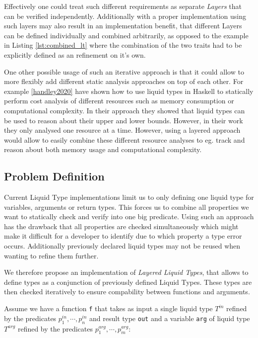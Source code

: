 \documentclass[acmsmall, review, screen]{acmart}
\begin{document}
Effectively one could treat such different requirements as separate \textit{Layers} that can be verified independently. Additionally with a proper implementation using such layers may also result in an implementation benefit, that different Layers can be defined individually and combined arbitrarily, as opposed to the example in Listing \ref{lst:combined_lt} where the combination of the two traits had to be explicitly defined as an refinement on it's own.

One other possible usage of such an iterative approach is that it could allow to more flexibly add different static analysis approaches on top of each other. For example \ref{handley2020} have shown how to use liquid types in Haskell to statically perform cost analysis of different resources such as memory consumption or computational complexity. In their approach they showed that liquid types can be used to reason about their upper and lower bounds. However, in their work they only analysed one resource at a time. However, using a layered approach would allow to easily combine these different resource analyses to eg. track and reason about both memory usage and computational complexity.

\subsection{Problem Definition}

Current Liquid Type implementations limit us to only defining one liquid type for variables, arguments or return types. This forces us to combine all properties we want to statically check and verify into one big predicate. Using such an approach has the drawback that all properties are checked simultaneously which might make it difficult for a developer to identify due to which property a type error occurs. Additionally previously declared liquid types may not be reused when wanting to refine them further.

We therefore propose an implementation of \textit{Layered Liquid Types}, that allows to define types as a conjunction of previously defined Liquid Types. These types are then checked iteratively to ensure compability between functions and arguments.

Assume we have a function \texttt{f} that takes as input a single liquid type $T^{in}$ refined by the predicates $p^{in}_1,\cdots,p^{in}_n$ and result type \texttt{out} and a variable \texttt{arg} of liquid type $T^{arg}$ refined by the predicates $p^{arg}_1,\cdots,p^{arg}_m$:
\end{document}
